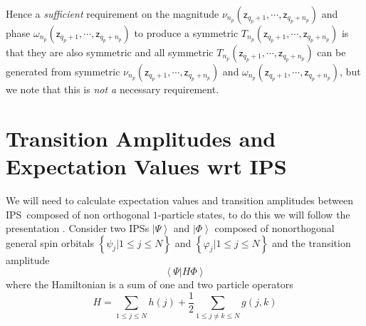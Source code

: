 \documentclass[aps,preprint]{revtex4}%
\begin{document}
Hence a \emph{sufficient} requirement on the magnitude $\nu_{n_{p}}\left(
\mathsf{z}_{q_{p}+1},\cdots,\mathsf{z}_{q_{p}+n_{p}}\right)  $ and phase
$\omega_{n_{p}}\left(  \mathsf{z}_{q_{p}+1},\cdots,\mathsf{z}_{q_{p}+n_{p}%
}\right)  $ to produce a symmetric $T_{n_{p}}\left(  \mathsf{z}_{q_{p}%
+1},\cdots,\mathsf{z}_{q_{p}+n_{p}}\right)  $ is that they are also symmetric
and all symmetric $T_{n_{p}}\left(  \mathsf{z}_{q_{p}+1},\cdots,\mathsf{z}%
_{q_{p}+n_{p}}\right)  $ can be generated from symmetric $\nu_{n_{p}}\left(
\mathsf{z}_{q_{p}+1},\cdots,\mathsf{z}_{q_{p}+n_{p}}\right)  $ and
$\omega_{n_{p}}\left(  \mathsf{z}_{q_{p}+1},\cdots,\mathsf{z}_{q_{p}+n_{p}%
}\right)  $, but we note that this is \emph{not a} necessary requirement.

\section{Transition Amplitudes and Expectation Values wrt IPS\label{Transamp}}

We will need to calculate expectation values and transition amplitudes between
IPS\ composed of non orthogonal $1$-particle states, to do this we will follow
the presentation \cite{Verbeek1990}. Consider two IPSs $\left\vert
\Psi\right\rangle $ and $\left\vert \Phi\right\rangle $ composed of
nonorthogonal general spin orbitals $\left\{  \psi_{j}|1\leq j\leq N\right\}
$ and $\left\{  \varphi_{j}|1\leq j\leq N\right\}  $ and the transition
amplitude
\begin{equation}
\left\langle \Psi|H\Phi\right\rangle
\end{equation}
where the Hamiltonian is a sum of one and two particle operators
\begin{equation}
H=%
{\displaystyle\sum\limits_{1\leq j\leq N}}
h\left(  j\right)  +\frac{1}{2}%
{\displaystyle\sum\limits_{1\leq j\neq k\leq N}}
g\left(  j,k\right)
\end{equation}
\end{document}
